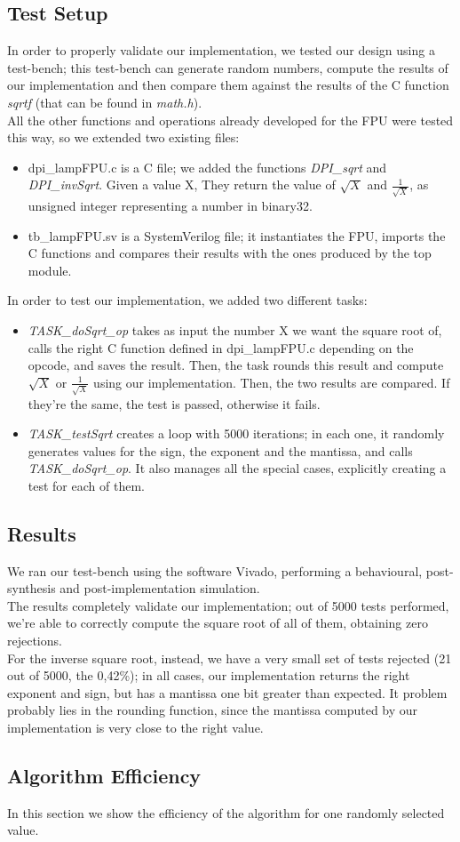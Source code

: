 \subsection{Test Setup}
In order to properly validate our implementation, we tested our design using a test-bench; this test-bench can generate random numbers, compute the results of our implementation and then compare them against the results of the C function \emph{sqrtf} (that can be found in \emph{math.h}).  \\
All the other functions and operations already developed for the FPU were tested this way, so we extended two existing files:
\begin{itemize}
\item dpi\_lampFPU.c is a C file; we added the functions \emph{DPI\_sqrt} and \emph{DPI\_invSqrt}. Given a value X, They return the value of $\sqrt{X}$ and $\frac{1}{\sqrt{X}}$, as unsigned integer representing a number in binary32.
\item tb\_lampFPU.sv is a SystemVerilog file; it instantiates the FPU, imports the C functions and compares their results with the ones produced by the top module. 
\end{itemize}

In order to test our implementation, we added two different tasks:
\begin{itemize}
\item \emph{TASK\_doSqrt\_op} takes as input the number X we want the square root of, calls the right C function defined in dpi\_lampFPU.c depending on the opcode, and saves the result. Then, the task rounds this result and compute $\sqrt{X}$ or $\frac{1}{\sqrt{X}}$ using our implementation. Then, the two results are compared. If they're the same, the test is passed, otherwise it fails. 
\item \emph{TASK\_testSqrt} creates a loop with 5000 iterations; in each one, it randomly generates values for the sign, the exponent and the mantissa, and calls \emph{TASK\_doSqrt\_op}. It also manages all the special cases, explicitly creating a test for each of them. 
\end{itemize}

\subsection{Results}
We ran our test-bench using the software Vivado, performing a behavioural, post-synthesis and post-implementation simulation.\\
The results completely validate our implementation; out of 5000 tests performed, we're able to correctly compute the square root of all of them, obtaining zero rejections. \\
For the inverse square root, instead, we have a very small set of tests rejected (21 out of 5000, the 0,42\%); in all cases, our implementation returns the right exponent and sign, but has a mantissa one bit greater than expected. It problem probably lies in the rounding function, since the mantissa computed by our implementation is very close to the right value.  

\subsection{Algorithm Efficiency}
In this section we show the efficiency of the algorithm for one randomly selected value. 



\clearpage
